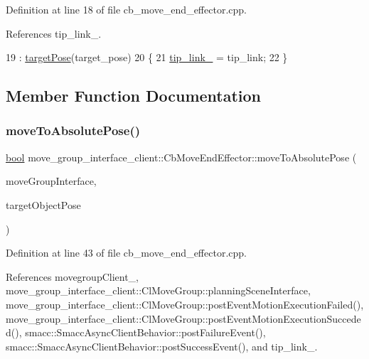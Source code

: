 Definition at line 18 of file cb\+\_\+move\+\_\+end\+\_\+effector.\+cpp.



References tip\+\_\+link\+\_\+.


\begin{DoxyCode}
19   : \hyperlink{classmove__group__interface__client_1_1CbMoveEndEffector_a645e7131ef58ab052efbadf53ea82c59}{targetPose}(target\_pose)
20 \{
21   \hyperlink{classmove__group__interface__client_1_1CbMoveEndEffector_a26d35b0beeb0476a62a46b9b9d659251}{tip\_link\_} = tip\_link;
22 \}
\end{DoxyCode}


\subsection{Member Function Documentation}
\mbox{\label{classmove__group__interface__client_1_1CbMoveEndEffector_a7850f5f9c6fbc040b77e8456a2ecee09}} 
\subsubsection{\texorpdfstring{move\+To\+Absolute\+Pose()}{moveToAbsolutePose()}}
{\footnotesize\ttfamily \hyperlink{classbool}{bool} move\+\_\+group\+\_\+interface\+\_\+client\+::\+Cb\+Move\+End\+Effector\+::move\+To\+Absolute\+Pose (\begin{DoxyParamCaption}\item[{moveit\+::planning\+\_\+interface\+::\+Move\+Group\+Interface \&}]{move\+Group\+Interface,  }\item[{geometry\+\_\+msgs\+::\+Pose\+Stamped \&}]{target\+Object\+Pose }\end{DoxyParamCaption})\hspace{0.3cm}{\ttfamily [protected]}}



Definition at line 43 of file cb\+\_\+move\+\_\+end\+\_\+effector.\+cpp.



References movegroup\+Client\+\_\+, move\+\_\+group\+\_\+interface\+\_\+client\+::\+Cl\+Move\+Group\+::planning\+Scene\+Interface, move\+\_\+group\+\_\+interface\+\_\+client\+::\+Cl\+Move\+Group\+::post\+Event\+Motion\+Execution\+Failed(), move\+\_\+group\+\_\+interface\+\_\+client\+::\+Cl\+Move\+Group\+::post\+Event\+Motion\+Execution\+Succeded(), smacc\+::\+Smacc\+Async\+Client\+Behavior\+::post\+Failure\+Event(), smacc\+::\+Smacc\+Async\+Client\+Behavior\+::post\+Success\+Event(), and tip\+\_\+link\+\_\+.



